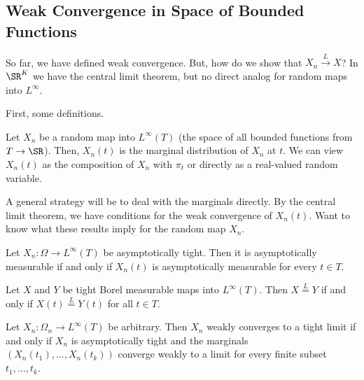 \subsection{Weak Convergence in Space of Bounded Functions}%
\label{subsec:vdv1.5}

So far, we have defined weak convergence. But, how do we show that \(X_n \overset{L}{\to}X\)? In \(\SR^K\) we have the central limit theorem, but no direct analog for random maps into \(L^\infty\).

First, some definitions. 

\begin{definition}
	\label{def:marginalRV}
	Let \(X_n\) be a random map into  \(L^\infty(T)\) (the space of all bounded functions from \(T\to\SR\)). Then, \(X_n(t)\) is the marginal distribution of  \(X_n\) at  \(t\). We can view  \(X_n(t)\) as the composition of  \(X_n\) with  \(\pi_t\) or directly as a real-valued random variable.
\end{definition}

A general strategy will be to deal with the marginals directly. By the central limit theorem, we have conditions for the weak convergence of \(X_n(t)\). Want to know what these results imply for the random map \(X_n\).

\begin{lemma}
	\label{lemma:vdv1.5.1}
	Let \(X_n:\Omega \to L^\infty(T)\) be asymptotically tight. Then it is asymptotically measurable if and only if  \(X_n(t)\) is asymptotically measurable for every  \(t \in T\).	
\end{lemma}

\begin{lemma}
	\label{lemma:vdv1.5.3}
	Let \(X\) and  \(Y\) be tight Borel measurable maps into \(L^\infty(T)\). Then  \(X \overset{L}{=}Y\) if and only if \(X(t)\overset{L}{=}Y(t)\) for all \(t\in T\).	
\end{lemma}

\begin{theorem}
	\label{thm:vdv1.5.4}
	Let \(X_n:\Omega_n \to L^\infty(T)\) be arbitrary. Then \(X_n\) weakly converges to a tight limit if and only if  \(X_n\) is asymptotically tight and the marginals  \(\left(X_n(t_1),\dots,X_n(t_k)\right)\) converge weakly to a limit for every finite subset \(t_1,\dots,t_k\).	
\end{theorem}


